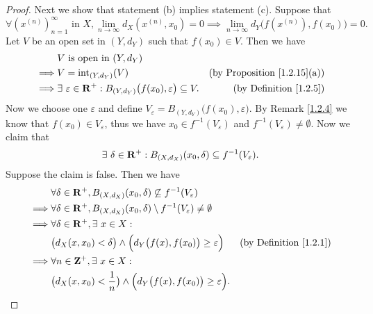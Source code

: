 \begin{proof}
    Next we show that statement (b) implies statement (c).
    Suppose that
    \[
        \forall (x^{(n)})_{n = 1}^\infty \text{ in } X, \lim_{n \to \infty} d_X(x^{(n)}, x_0) = 0 \implies \lim_{n \to \infty} d_Y\big(f(x^{(n)}), f(x_0)\big) = 0.
    \]
    Let \(V\) be an open set in \((Y, d_Y)\) such that \(f(x_0) \in V\).
    Then we have
    \begin{align*}
                 & V \text{ is open in } (Y, d_Y)                                                                                                   \\
        \implies & V = \text{int}_{(Y, d_Y)}(V)                                                           & \text{(by Proposition \ref{1.2.15}(a))} \\
        \implies & \exists\ \varepsilon \in \mathbf{R}^+ : B_{(Y, d_Y)}\big(f(x_0), \varepsilon\big) \subseteq V. & \text{(by Definition \ref{1.2.5})}
    \end{align*}
    Now we choose one \(\varepsilon\) and define \(V_\varepsilon = B_{(Y, d_Y)}\big(f(x_0), \varepsilon\big)\).
    By Remark \ref{1.2.4} we know that \(f(x_0) \in V_\varepsilon\), thus we have \(x_0 \in f^{-1}(V_\varepsilon)\) and \(f^{-1}(V_\varepsilon) \neq \emptyset\).
    Now we claim that
    \[
        \exists\ \delta \in \mathbf{R}^+ : B_{(X, d_X)}(x_0, \delta) \subseteq f^{-1}(V_\varepsilon).
    \]
    Suppose the claim is false.
    Then we have
    \begin{align*}
                 & \forall \delta \in \mathbf{R}^+, B_{(X, d_X)}(x_0, \delta) \not\subseteq f^{-1}(V_\varepsilon)                                                 \\
        \implies & \forall \delta \in \mathbf{R}^+, B_{(X, d_X)}(x_0, \delta) \setminus f^{-1}(V_\varepsilon) \neq \emptyset                                      \\
        \implies & \forall \delta \in \mathbf{R}^+, \exists\ x \in X :                                                                                            \\
                 & \big(d_X(x, x_0) < \delta\big) \land \Big(d_Y\big(f(x), f(x_0)\big) \geq \varepsilon\Big)         & \text{(by Definition \ref{1.2.1})} \\
        \implies & \forall n \in \mathbf{Z}^+, \exists\ x \in X :                                                                                                 \\
                 & \big(d_X(x, x_0) < \frac{1}{n}\big) \land \Big(d_Y\big(f(x), f(x_0)\big) \geq \varepsilon\Big).
    \end{align*}

\end{proof}

